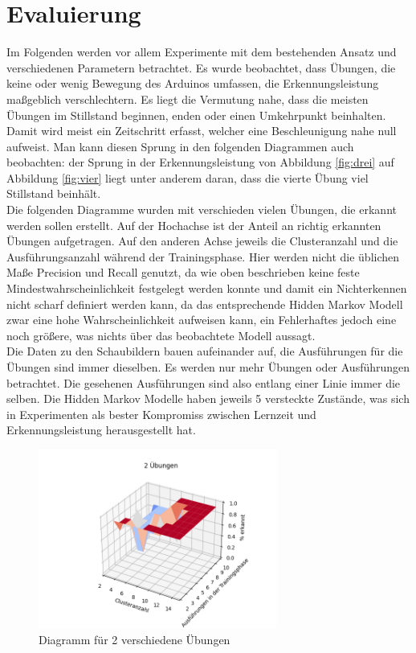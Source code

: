 \documentclass{article}
\begin{document}
\newpage
\section{Evaluierung}
\label{sec:evaluation}
Im Folgenden werden vor allem Experimente mit dem bestehenden Ansatz und verschiedenen Parametern betrachtet.
Es wurde beobachtet, dass Übungen, die keine oder wenig Bewegung des Arduinos umfassen, die Erkennungsleistung maßgeblich verschlechtern.
Es liegt die Vermutung nahe, dass die meisten Übungen im Stillstand beginnen, enden oder einen \glqq Umkehrpunkt\grqq{} beinhalten.
Damit wird meist ein Zeitschritt erfasst, welcher eine Beschleunigung nahe null aufweist.
Man kann diesen Sprung in den folgenden Diagrammen auch beobachten: der Sprung in der Erkennungsleistung von Abbildung \ref{fig:drei} auf Abbildung \ref{fig:vier} liegt unter anderem daran, dass die vierte Übung viel Stillstand beinhält.\\
Die folgenden Diagramme wurden mit verschieden vielen Übungen, die erkannt werden sollen erstellt.
Auf der Hochachse ist der Anteil an richtig erkannten Übungen aufgetragen.
Auf den anderen Achse jeweils die Clusteranzahl und die Ausführungsanzahl während der Trainingsphase.
Hier werden nicht die üblichen Maße Precision und Recall genutzt, da wie oben beschrieben keine feste Mindestwahrscheinlichkeit festgelegt werden konnte und damit ein Nichterkennen nicht scharf definiert werden kann, da das entsprechende Hidden Markov Modell zwar eine hohe Wahrscheinlichkeit aufweisen kann, ein Fehlerhaftes jedoch eine noch größere, was nichts über das beobachtete Modell aussagt.\\ %
Die Daten zu den Schaubildern bauen aufeinander auf, die Ausführungen für die Übungen sind immer dieselben.
Es werden nur mehr Übungen oder Ausführungen betrachtet.
Die gesehenen Ausführungen sind also entlang einer Linie immer die selben.
Die Hidden Markov Modelle haben jeweils 5 versteckte Zustände, was sich in Experimenten als bester Kompromiss zwischen Lernzeit und Erkennungsleistung herausgestellt hat.
\medskip
\begin{figure}[h]
\centering
\includegraphics[width=0.7\textwidth]{figures/2_graph.png}
\caption{Diagramm für 2 verschiedene Übungen}
\label{fig:zwei}
\end{figure}\\
\end{document}
